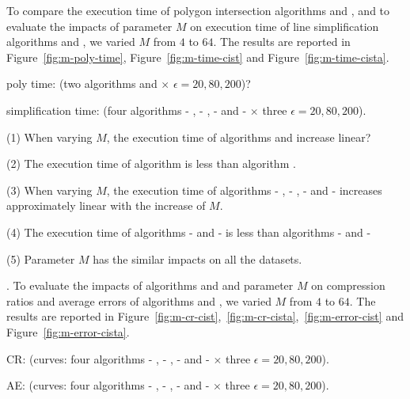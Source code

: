 
To compare the execution time of polygon intersection algorithms \rpia and \cpia, and to evaluate the impacts of parameter $M$ on execution time of line simplification algorithms \cist and \cista, we varied $M$ from $4$ to $64$.
The results are reported in Figure~\ref{fig:m-poly-time}, Figure~\ref{fig:m-time-cist} and Figure~\ref{fig:m-time-cista}.

poly time: (\textcolor[rgb]{0.00,0.07,1.00}{two algorithms \rpia and \cpia $\times$ $\epsilon = 20, 80, 200$})?

simplification time: (\textcolor[rgb]{0.00,0.07,1.00}{four algorithms \cist - \rpia, \cist - \cpia, \cista- \rpia and \cista- \cpia $\times$  three $\epsilon = 20, 80, 200$}).
 
\ni(1) When varying $M$, the execution time of algorithms \rpia and \cpia increase linear? 
 
\ni(2) The execution time of algorithm \rpia is less than algorithm \cpia.

\ni(3) When varying $M$, the execution time of algorithms \cist - \rpia, \cist - \cpia, \cista- \rpia and \cista- \cpia increases approximately linear with the increase of $M$.

 
\ni(4) The execution time of algorithms \cist - \rpia and \cista- \rpia is less than algorithms \cist - \cpia and \cista- \cpia 

\ni(5) Parameter $M$ has the similar impacts on all the datasets.

.
To evaluate the impacts of algorithms \rpia and \cpia and parameter $M$ on compression ratios and average errors of algorithms \cist and \cista, we varied $M$ from $4$ to $64$.
The results are reported in Figure~\ref{fig:m-cr-cist},~\ref{fig:m-cr-cista},~\ref{fig:m-error-cist} and Figure~\ref{fig:m-error-cista}.

CR: (\textcolor[rgb]{0.00,0.07,1.00}{curves: four algorithms \cist - \rpia, \cist - \cpia, \cista- \rpia and \cista- \cpia $\times$  three $\epsilon = 20, 80, 200$}).

AE: (\textcolor[rgb]{0.00,0.07,1.00}{curves: four algorithms \cist - \rpia, \cist - \cpia, \cista- \rpia and \cista- \cpia $\times$  three $\epsilon = 20, 80, 200$}).

